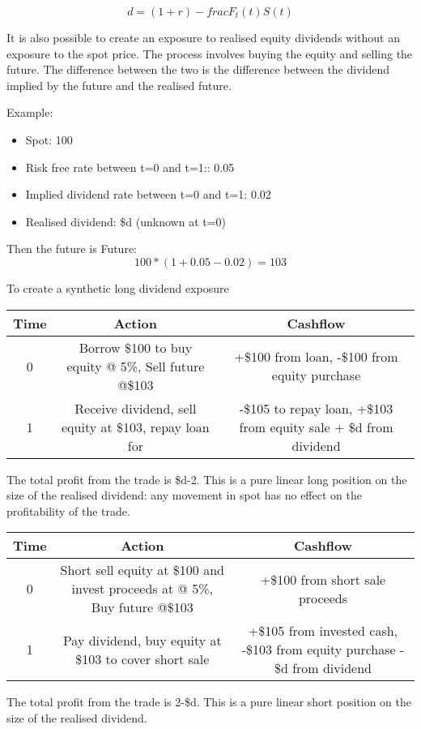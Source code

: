\documentclass{tran-l}
\theoremstyle{definition}
\theoremstyle{remark}
\numberwithin{equation}{subsection}
\begin{document}
\[ d = (1+r)-frac{F_t(t)}{S(t)}  \]

It is also possible to create an exposure to realised equity dividends without an exposure to the spot price. The process involves buying the equity and selling the future. The difference between the two is the difference between the dividend implied by the future and the realised future.

Example:
\begin{itemize}
\item Spot: 100
\item Risk free rate between t=0 and t=1:: 0.05
\item Implied dividend rate between t=0 and t=1: 0.02
\item Realised dividend: \$d (unknown at t=0)
\end{itemize}

Then the future is Future: \[100*(1+ 0.05-0.02) = 103\]


To create a synthetic long dividend exposure

\begin{tabular}{|ccc|}
\hline
Time & Action & Cashflow\\
\hline
0 & Borrow \$100 to buy equity @ 5\%, Sell future @\$103 & +\$100 from loan, -\$100 from equity purchase \\
1 & Receive dividend, sell equity at \$103, repay loan for & -\$105 to repay loan, +\$103 from equity sale + \$d from dividend\\
\hline
\end{tabular}

The total profit from the trade is \$d-2. This is a pure linear long position on the size of the realised dividend: any movement in spot has no effect on the profitability of the trade.


\begin{tabular}{|ccc|}
\hline
Time & Action & Cashflow\\
\hline
0 & Short sell equity at \$100 and invest proceeds at @ 5\%, Buy future @\$103 & +\$100 from short sale proceeds \\
1 & Pay dividend, buy equity at \$103 to cover short sale & +\$105 from invested cash, -\$103 from equity purchase - \$d from dividend\\
\hline
\end{tabular}

The total profit from the trade is 2-\$d. This is a pure linear short position on the size of the realised dividend. 
\end{document}

